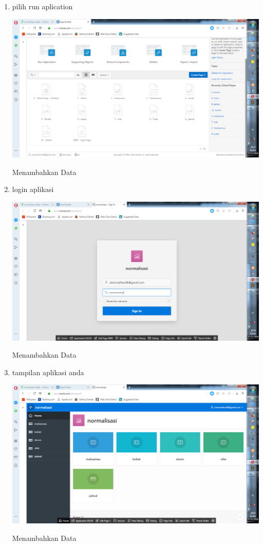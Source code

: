 \documentclass{article}
\begin{document}
\begin{enumerate}
        \item pilih run aplication
    \begin{center}
         \centering
            \includegraphics[scale=0.27]{gambar/24.png}
        \caption{Menambahkan Data}
        \label{excel}
    \end{center}
    
        \item login aplikasi
    \begin{center}
         \centering
            \includegraphics[scale=0.27]{gambar/25.png}
        \caption{Menambahkan Data}
        \label{excel}
    \end{center}
    
            \item tampilan aplikasi anda
    \begin{center}
         \centering
            \includegraphics[scale=0.27]{gambar/26.png}
        \caption{Menambahkan Data}
        \label{excel}
    \end{center}
    

\end{enumerate}
\end{document}
